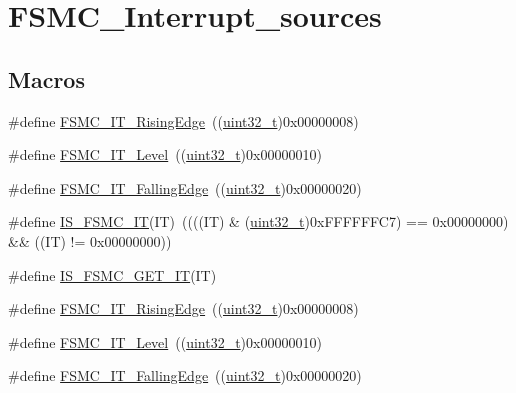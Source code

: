 \hypertarget{group___f_s_m_c___interrupt__sources}{}\section{F\+S\+M\+C\+\_\+\+Interrupt\+\_\+sources}
\label{group___f_s_m_c___interrupt__sources}
\subsection*{Macros}
\begin{DoxyCompactItemize}
\item 
\#define \hyperlink{group___f_s_m_c___interrupt__sources_gac483854bd6f90d8c7899a597a0c0ab1a}{F\+S\+M\+C\+\_\+\+I\+T\+\_\+\+Rising\+Edge}~((\hyperlink{_p_e___types_8h_a33594304e786b158f3fb30289278f5af}{uint32\+\_\+t})0x00000008)
\item 
\#define \hyperlink{group___f_s_m_c___interrupt__sources_ga59b5839854074008fb36fa86ec50a0c7}{F\+S\+M\+C\+\_\+\+I\+T\+\_\+\+Level}~((\hyperlink{_p_e___types_8h_a33594304e786b158f3fb30289278f5af}{uint32\+\_\+t})0x00000010)
\item 
\#define \hyperlink{group___f_s_m_c___interrupt__sources_ga8e4b9589c9981c900b5f2e84581a9693}{F\+S\+M\+C\+\_\+\+I\+T\+\_\+\+Falling\+Edge}~((\hyperlink{_p_e___types_8h_a33594304e786b158f3fb30289278f5af}{uint32\+\_\+t})0x00000020)
\item 
\#define \hyperlink{group___f_s_m_c___interrupt__sources_ga40a38f097a75f27a700e626905fa9a38}{I\+S\+\_\+\+F\+S\+M\+C\+\_\+\+IT}(IT)~((((IT) \& (\hyperlink{_p_e___types_8h_a33594304e786b158f3fb30289278f5af}{uint32\+\_\+t})0x\+F\+F\+F\+F\+F\+F\+C7) == 0x00000000) \&\& ((\+I\+T) != 0x00000000))
\item 
\#define \hyperlink{group___f_s_m_c___interrupt__sources_gae2a57d0b15e025212489ec1421ff245d}{I\+S\+\_\+\+F\+S\+M\+C\+\_\+\+G\+E\+T\+\_\+\+IT}(IT)
\item 
\#define \hyperlink{group___f_s_m_c___interrupt__sources_gac483854bd6f90d8c7899a597a0c0ab1a}{F\+S\+M\+C\+\_\+\+I\+T\+\_\+\+Rising\+Edge}~((\hyperlink{_p_e___types_8h_a33594304e786b158f3fb30289278f5af}{uint32\+\_\+t})0x00000008)
\item 
\#define \hyperlink{group___f_s_m_c___interrupt__sources_ga59b5839854074008fb36fa86ec50a0c7}{F\+S\+M\+C\+\_\+\+I\+T\+\_\+\+Level}~((\hyperlink{_p_e___types_8h_a33594304e786b158f3fb30289278f5af}{uint32\+\_\+t})0x00000010)
\item 
\#define \hyperlink{group___f_s_m_c___interrupt__sources_ga8e4b9589c9981c900b5f2e84581a9693}{F\+S\+M\+C\+\_\+\+I\+T\+\_\+\+Falling\+Edge}~((\hyperlink{_p_e___types_8h_a33594304e786b158f3fb30289278f5af}{uint32\+\_\+t})0x00000020)

\end{DoxyCompactItemize}
